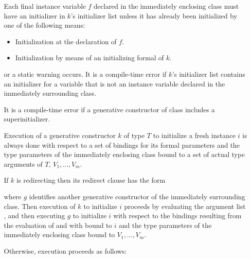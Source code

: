 \documentclass{article}
\begin{document}
\LMHash{}
Each final instance variable $f$ declared in the immediately enclosing class must have an initializer in $k$'s initializer list unless it has already been initialized by one of the following means:
\begin{itemize}
\item Initialization at the declaration of $f$.
\item Initialization by means of an initializing formal of $k$.
\end{itemize}

or a static warning occurs.
It is a compile-time error if $k$'s initializer list contains an initializer for a variable that is not an instance variable declared in the immediately surrounding class.


\LMHash{}
It is a compile-time error if a generative constructor of class  includes a superinitializer.

\LMHash{}
Execution of a generative constructor $k$ of type $T$ to initialize a fresh instance $i$
is always done with respect to a set of bindings for its formal parameters
and the type parameters of the immediately enclosing class bound to a set of actual type arguments of $T$, $V_1, \ldots, V_m$.


\LMHash{}
If $k$ is redirecting then its redirect clause has the form


where $g$ identifies another  generative constructor of the immediately surrounding class.
Then execution of $k$ to initialize $i$ proceeds by evaluating the argument list
,
and then executing $g$ to initialize $i$ with respect to the bindings resulting from the evaluation of
and with \THIS{} bound to $i$ and the type parameters of the immediately enclosing class bound to $V_1, \ldots, V_m$.

\LMHash{}
Otherwise, execution proceeds as follows:
\end{document}

